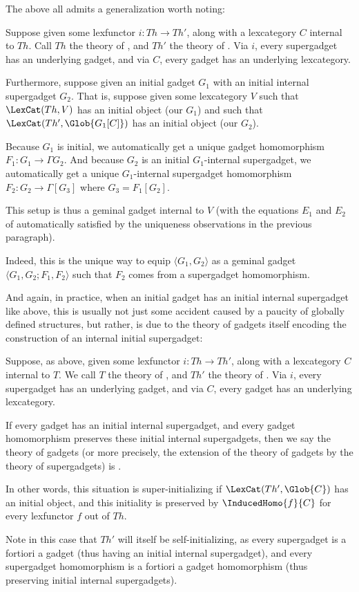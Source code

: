 The above all admits a generalization worth noting:

\begin{construction}\label{SuperInitoGeminalYieldsGeminal}
Suppose given some lexfunctor $i : Th \to Th'$, along with a lexcategory $C$ internal to $Th$. Call $Th$ the theory of , and $Th'$ the theory of . Via $i$, every supergadget has an underlying gadget, and via $C$, every gadget has an underlying lexcategory.

Furthermore, suppose given an initial gadget $G_1$ with an initial internal supergadget $G_2$. That is, suppose given some lexcategory $V$ such that $\LexCat(Th, V)$ has an initial object (our $G_1$) and such that $\LexCat(Th', \Glob{G_1[C]})$ has an initial object (our $G_2$).

Because $G_1$ is initial, we automatically get a unique gadget homomorphism $F_1: G_1 \to \Gamma{G_2}$. And because $G_2$ is an initial $G_1$-internal supergadget, we automatically get a unique $G_1$-internal supergadget homomorphism $F_2 : G_2 \to \Gamma[G_3]$ where $G_3 = F_1[G_2]$.

This setup is thus a geminal gadget internal to $V$ (with the equations $E_1$ and $E_2$ of  automatically satisfied by the uniqueness observations in the previous paragraph).

Indeed, this is the unique way to equip $\langle G_1, G_2 \rangle$ as a geminal gadget $\langle G_1, G_2; F_1, F_2 \rangle$ such that $F_2$ comes from a supergadget homomorphism.
\end{construction}

And again, in practice, when an initial gadget has an initial internal supergadget like above, this is usually not just some accident caused by a paucity of globally defined structures, but rather, is due to the theory of gadgets itself encoding the construction of an internal initial supergadget:

\begin{definition}
Suppose, as above, given some lexfunctor $i : Th \to Th'$, along with a lexcategory $C$ internal to $T$. We call $T$ the theory of , and $Th'$ the theory of . Via $i$, every supergadget has an underlying gadget, and via $C$, every gadget has an underlying lexcategory.

If every gadget has an initial internal supergadget, and every gadget homomorphism preserves these initial internal supergadgets, then we say the theory of gadgets (or more precisely, the extension of the theory of gadgets by the theory of supergadgets) is .

In other words, this situation is super-initializing if $\LexCat(Th', \Glob{C})$ has an initial object, and this initiality is preserved by $\InducedHomo{f}{C}$ for every lexfunctor $f$ out of $Th$.

Note in this case that $Th'$ will itself be self-initializing, as every supergadget is a fortiori a gadget (thus having an initial internal supergadget), and every supergadget homomorphism is a fortiori a gadget homomorphism (thus preserving initial internal supergadgets).
\end{definition}

